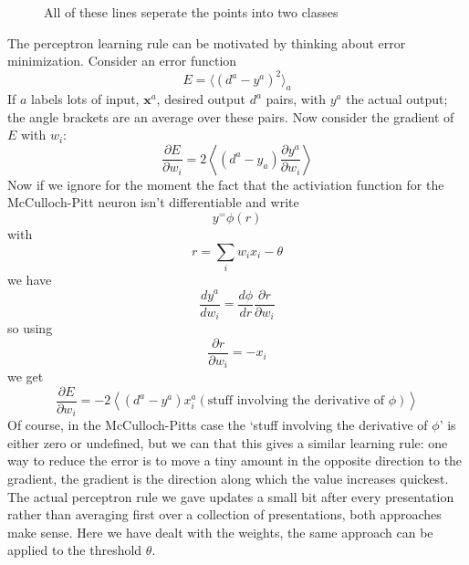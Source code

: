 \documentclass[12pt]{article}
\begin{document}
\begin{figure}

\caption{All of these lines seperate the points into two classes\label{random_points}}
\end{figure}

The perceptron learning rule can be motivated by thinking about error
minimization. Consider an error function
\begin{equation}
E=\langle(d^a-y^a)^2\rangle_a
\end{equation}
If $a$ labels lots of input, $\textbf{x}^a$, desired output $d^a$
pairs, with $y^a$ the actual output; the angle brackets are an average
over these pairs. Now consider the gradient of $E$ with $w_{i}$:
\begin{equation}
\frac{\partial E}{\partial w_{i}}=2\left\langle (d^a-y_a) \frac{\partial y^a}{\partial w_{i}}\right\rangle
\end{equation}
Now if we ignore for the moment the fact that the activiation function for the McCulloch-Pitt neuron isn't differentiable and write
\begin{equation}
y^=\phi(r)
\end{equation}
with 
\begin{equation}
r=\sum_{i}w_i x_i-\theta
\end{equation}
we have
\begin{equation}
\frac{dy^a}{dw_i}=\frac{d\phi}{dr}\frac{\partial r}{\partial w_i}
\end{equation}
so using
\begin{equation}
\frac{\partial r}{\partial w_i}=-x_i
\end{equation}
we get
\begin{equation}
\frac{\partial E}{\partial w_{i}}=-2\left\langle (d^a-y^a)x^a_i (\mbox{stuff involving the derivative of }\phi)\right\rangle
\end{equation}
Of course, in the McCulloch-Pitts case the \lq{}stuff involving the
derivative of $\phi$\rq{} is either zero or undefined, but we can that
this gives a similar learning rule: one way to reduce the error is to
move a tiny amount in the opposite direction to the gradient, the
gradient is the direction along which the value increases
quickest. The actual perceptron rule we gave updates a small bit after
every presentation rather than averaging first over a collection of
presentations, both approaches make sense. Here we have dealt with the
weights, the same approach can be applied to the threshold $\theta$.
\end{document}

